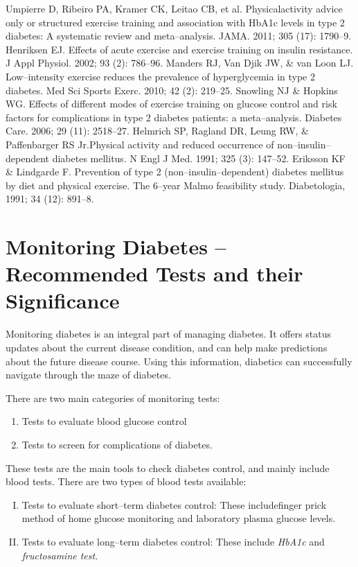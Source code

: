 \begin{thebibliography}{99}
 Umpierre D, Ribeiro PA, Kramer CK, Leitao CB, et al. Physical\break activity advice only or structured exercise training and association with HbA1c levels in type 2 diabetes: A systematic review and meta–analysis. JAMA. 2011; 305 (17): 1790–9.
 Henriksen EJ. Effects of acute exercise and exercise training on insulin resistance. J Appl Physiol. 2002; 93 (2): 786–96.
 Manders RJ, Van Djik JW, \& van Loon LJ. Low–intensity exercise reduces the prevalence of hyperglycemia in type 2 diabetes. Med Sci Sports Exerc. 2010; 42 (2): 219–25.
 Snowling NJ \& Hopkins WG. Effects of different modes of exercise training on glucose control and risk factors for complications in type 2 diabetes patients: a meta–analysis. Diabetes Care. 2006; 29 (11): 2518–27.
 Helmrich SP, Ragland DR, Leung RW, \& Paffenbarger RS Jr.\break Physical activity and reduced occurrence of non–insulin–dependent diabetes mellitus. N Engl J Med. 1991; 325 (3): 147–52.
 Eriksson KF \& Lindgarde F. Prevention of type 2 (non–insulin–dependent) diabetes mellitus by diet and physical exercise. The 6–year Malmo feasibility study. Diabetologia, 1991; 34 (12): 891–8.
\end{thebibliography}


\chapter{Monitoring Diabetes – Recommended Tests and their Significance}\label{chap24}

Monitoring diabetes is an integral part of managing diabetes. It offers status updates about the current disease condition, and can help make predictions about the future disease course. Using this information, diabetics can successfully navigate through the maze of diabetes.

\noindent There are two main categories of monitoring tests:
\begin{enumerate}
\itemsep=0pt
\item Tests to evaluate blood glucose control
\item Tests to screen for complications of diabetes.
\end{enumerate}


These tests are the main tools to check diabetes control, and mainly include blood tests. There are two types of blood tests available:
\begin{enumerate}[I.]
\itemsep=0pt
\item Tests to evaluate short–term diabetes control: These include\break finger prick method of home glucose monitoring and laboratory plasma glucose levels.
\item Tests to evaluate long–term diabetes control: These include \textit{HbA1c} and \textit{fructosamine test}.
\end{enumerate}

